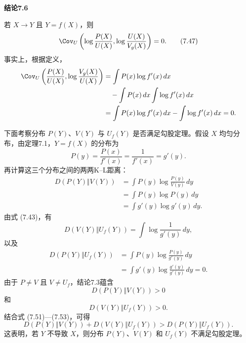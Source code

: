 \par\medskip{}\noindent\textbf{结论7.6}\par
若 $X\to Y$ 且 $Y=f(X)$，则
\begin{equation}
\Cov_U\left(\log\frac{P(X)}{U(X)},\log\frac{U(X)}{V_g(X)}\right)=0.
\tag{7.47}
\end{equation}
事实上，根据定义，
\[
\begin{aligned}
\Cov_U\left(\frac{P(X)}{U(X)},\log\frac{V_g(X)}{U(X)}\right)
&=\int P(x)\log f'(x)\,dx\\
&\hspace{1em}-\int P(x)\,dx\int\log f'(x)\,dx\\
&=\int P(x)\log f'(x)\,dx-\int\log f'(x)\,dx=0.
\end{aligned}
\]

下面考察分布 $P(Y)$、$V(Y)$ 与 $U_f(Y)$ 是否满足勾股定理。假设 $X$ 均匀分布，由定理7.1，$Y=f(X)$ 的分布为
\begin{equation}
P(y)=\frac{P(x)}{f'(x)}=\frac1{f'(x)}=g'(y).
\tag{7.48}
\end{equation}
再计算这三个分布之间的两两K–L距离：
\begin{equation}
\begin{aligned}
D(P(Y)\Vert V(Y))&=\int P(y)\log\frac{P(y)}{V(y)}\,dy\\
&=\int P(y)\log P(y)\,dy\\
&=\int g'(y)\log g'(y)\,dy.
\end{aligned}
\tag{7.49}
\end{equation}
由式 (7.43)，有
\begin{equation}
D(V(Y)\Vert U_f(Y))=\int\log\frac1{g'(y)}\,dy,
\tag{7.50}
\end{equation}
以及
\begin{equation}
\begin{aligned}
D(P(Y)\Vert U_f(Y))&=\int P(y)\log\frac{P(y)}{g'(y)}\,dy\\
&=\int g'(y)\log\frac{g'(y)}{g'(y)}\,dy=0.
\end{aligned}
\tag{7.51}
\end{equation}
由于 $P\ne V$ 且 $V\ne U_f$，结论7.3蕴含
\begin{equation}
D(P(Y)\Vert V(Y))>0
\tag{7.52}
\end{equation}
和
\begin{equation}
D(V(Y)\Vert U_f(Y))>0.
\tag{7.53}
\end{equation}
结合式 (7.51)—(7.53)，可得
\begin{equation}
D(P(Y)\Vert V(Y))+D(V(Y)\Vert U_f(Y))>D(P(Y)\Vert U_f(Y)).
\tag{7.54}
\end{equation}
这表明，若 $Y$ 不导致 $X$，则分布 $P(Y)$、$V(Y)$ 和 $U_f(Y)$ 不满足勾股定理。
\FloatBarrier
